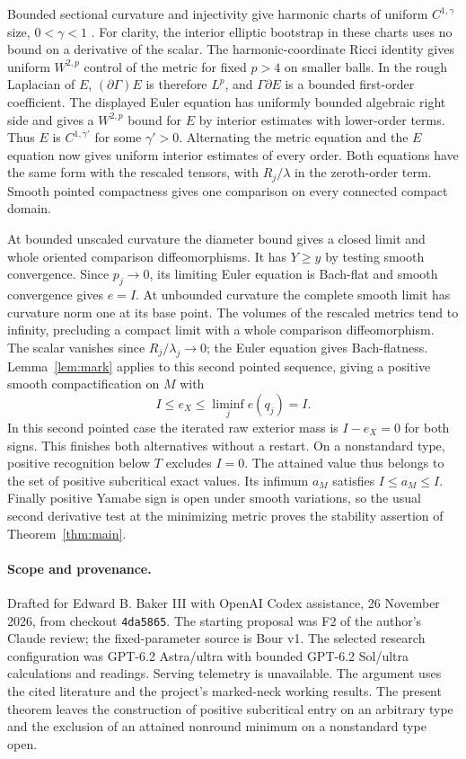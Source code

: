 \documentclass[11pt,letterpaper]{article}
\begin{document}
Bounded sectional curvature and injectivity give harmonic charts of
uniform \(C^{1,\gamma}\) size, \(0<\gamma<1\)
\cite[Theorem 4.3]{Peters1987Convergence}.
For clarity, the interior elliptic bootstrap in these charts uses
no bound on a derivative of the scalar. The harmonic-coordinate
Ricci identity gives uniform \(W^{2,p}\) control of the metric \cite[Lemma 4.1 and (4.3)]{DeTurckKazdan1981Regularity} for
fixed \(p>4\) on smaller balls. In the rough Laplacian of \(E\),
\((\partial\Gamma)E\) is therefore \(L^p\), and \(\Gamma\partial E\)
is a bounded first-order coefficient. The displayed Euler equation
has uniformly bounded algebraic right side and gives a \(W^{2,p}\)
bound for \(E\) by interior estimates with lower-order terms.
Thus \(E\) is \(C^{1,\gamma'}\) for some \(\gamma'>0\).
Alternating the metric equation and the \(E\) equation now gives
uniform interior estimates of every order. Both equations have the
same form with the rescaled tensors, with \(R_j/\lambda\) in the
zeroth-order term. Smooth pointed compactness gives one comparison
on every connected compact domain.

At bounded unscaled curvature the diameter bound gives a closed
limit and whole oriented comparison diffeomorphisms. It has \(Y\ge y\)
by testing smooth convergence. Since \(p_j\to0\), its limiting Euler
equation is Bach-flat and smooth convergence gives \(e=I\).
At unbounded curvature the complete smooth limit has curvature norm
one at its base point. The volumes of the rescaled metrics tend to
infinity, precluding a compact limit with a whole comparison
diffeomorphism. The scalar vanishes since \(R_j/\lambda_j\to0\);
the Euler equation gives Bach-flatness. Lemma~\ref{lem:mark} applies
to this second pointed sequence, giving a positive smooth compactification
on \(M\) with
\[
 I\le e_X\le\liminf_j e(q_j)=I .
\]
In this second pointed case the iterated raw exterior mass is
\(I-e_X=0\) for both signs. This finishes both alternatives without
a restart. On a nonstandard
type, positive recognition below \(T\) excludes \(I=0\). The attained
value thus belongs to the set of positive subcritical exact values.
Its infimum \(a_M\) satisfies \(I\le a_M\le I\). Finally positive Yamabe
sign is open under smooth variations, so the usual second derivative
test at the minimizing metric proves the stability assertion of
Theorem~\ref{thm:main}.

\paragraph{Scope and provenance.}
Drafted for Edward B. Baker III with OpenAI Codex assistance,
26 November 2026, from checkout \texttt{4da5865}. The starting proposal
was F2 of the author's Claude review; the fixed-parameter source is
Bour v1. The selected research configuration was GPT-6.2 Astra/ultra
with bounded GPT-6.2 Sol/ultra calculations and readings. Serving
telemetry is unavailable. The argument uses the cited literature and
the project's marked-neck working results. The present theorem leaves
the construction of positive subcritical entry on an arbitrary type
and the exclusion of an attained nonround minimum on a nonstandard type
open.



\end{document}
